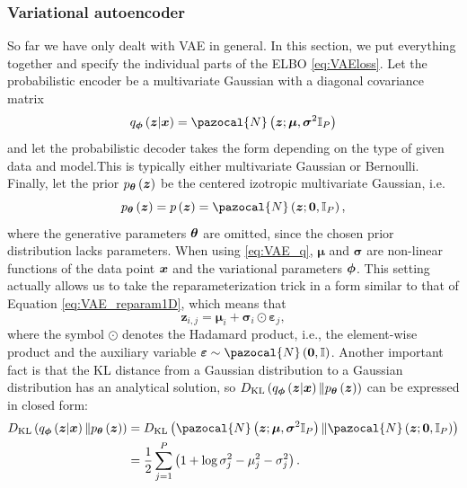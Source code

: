 \subsubsection{Variational autoencoder}
So far we have only dealt with VAE in general. In this section, we put everything together and specify the individual parts of the ELBO \eqref{eq:VAEloss}.
Let the probabilistic encoder be a multivariate Gaussian with a diagonal covariance matrix
\begin{equation}\label{eq:VAE_q}
q_{\bphi}\left(\boldsymbol{z}\vert \bx \right) = \pazocal{N}\left(\boldsymbol{z}; \boldsymbol{\mu},\boldsymbol{\sigma}^2\mathbb{I}_P  \right) 
\end{equation}
and let the probabilistic decoder takes the form depending on the type of given data and model.This is typically either multivariate Gaussian or Bernoulli. Finally, let the prior $p_{\boldsymbol{\theta}}\left(\boldsymbol{z}\right)$ be the centered izotropic multivariate Gaussian, i.e.
\begin{equation}
p_{\bt}\left(\boldsymbol{z} \right) = p\left(\boldsymbol{z} \right) = \pazocal{N}\left(\boldsymbol{z}; \boldsymbol{0},\mathbb{I}_P  \right),
\end{equation}
where the generative parameters $\boldsymbol{\theta}$ are omitted, since the chosen prior distribution lacks parameters. When using \eqref{eq:VAE_q}, $\boldsymbol{\mu}$ and $\boldsymbol{\sigma}$ are non-linear functions of the data point $\boldsymbol{x}$ and the variational parameters $\boldsymbol{\phi}$. This setting actually allows us to take the reparameterization trick in a form similar to that of Equation \eqref{eq:VAE_reparam1D}, which means that
\begin{equation}\label{eq:reparam_specific}
\boldsymbol{z}_{i,j} = \boldsymbol{\mu}_i + \boldsymbol{\sigma}_i\odot\boldsymbol{\varepsilon}_j ,
\end{equation}
where the symbol $\odot$ denotes the Hadamard product, i.e., the element-wise product and the auxiliary variable $\boldsymbol{\varepsilon} \sim \pazocal{N}\left(\boldsymbol{0},\mathbb{I} \right)$.
Another important fact is that the KL distance from a Gaussian distribution to a Gaussian distribution has an analytical solution, so $D_{\mathrm{KL}} \left(q_{\boldsymbol{\phi}}\left(\boldsymbol{z}\vert \boldsymbol{x} \right) \Vert p_{\boldsymbol{\theta}}\left(\boldsymbol{z}\right) \right)$ can be expressed in closed form:
\begin{equation}
\begin{split}
 \KL{q_{\bphi}\left(\bz\vert \bx \right)}{p_{\bt}\left(\bz\right)} & = \KL{\pazocal{N}\left(\boldsymbol{z}; \boldsymbol{\mu},\boldsymbol{\sigma}^2\mathbb{I}_P  \right) }{\pazocal{N}\left(\boldsymbol{z}; \boldsymbol{0},\mathbb{I}_P  \right)}\\ & =\frac{1}{2}\sum_{j=1}^P\left(1 + \log\sigma^2_j -\mu_j^2 -\sigma_j^2 \right).
\end{split}
\end{equation}
